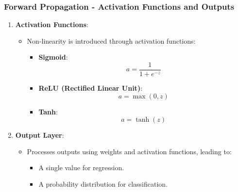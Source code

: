 \documentclass[aspectratio=169]{beamer}
\begin{document}
\begin{frame}[fragile]
    \frametitle{Forward Propagation - Activation Functions and Outputs}
    \begin{enumerate}[resume]
        \item \textbf{Activation Functions}:
            \begin{itemize}
                \item Non-linearity is introduced through activation functions:
                \begin{itemize}
                    \item \textbf{Sigmoid}:
                        \begin{equation}
                            a = \frac{1}{1 + e^{-z}}
                        \end{equation}
                    \item \textbf{ReLU (Rectified Linear Unit)}:
                        \begin{equation}
                            a = \max(0, z)
                        \end{equation}
                    \item \textbf{Tanh}:
                        \begin{equation}
                            a = \tanh(z)
                        \end{equation}
                \end{itemize}
            \end{itemize}
        \item \textbf{Output Layer}:
            \begin{itemize}
                \item Processes outputs using weights and activation functions, leading to:
                \begin{itemize}
                    \item A single value for regression.
                    \item A probability distribution for classification.
                \end{itemize}
            \end{itemize}
    \end{enumerate}
\end{frame}
\end{document}
